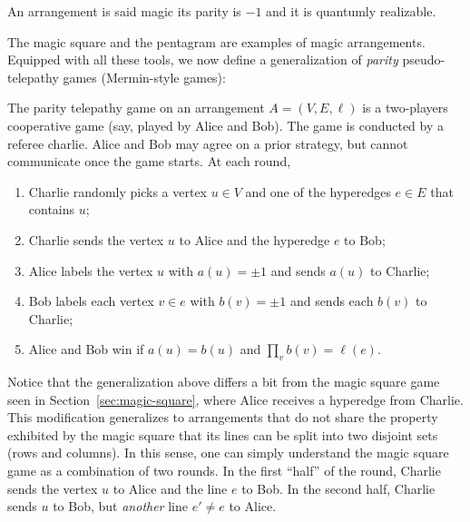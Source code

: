\documentclass{llncs}
\begin{document}
\begin{definition}\label{def:magic-arr}
  An arrangement is said magic its parity is \(-1\) and it is
  quantumly realizable.
\end{definition}

The magic square and the pentagram are examples of magic arrangements.
Equipped with all these tools, we now define a generalization of \emph{parity}
pseudo-telepathy games (Mermin-style games):

\begin{definition}\label{def:parity-game}
  The parity telepathy game on an arrangement \(A = (V, E, \ell)\) is
  a two-players cooperative game (say, played by Alice and Bob). The
  game is conducted by a referee charlie. Alice and Bob may agree on a
  prior strategy, but cannot communicate once the game starts. At each
  round,
  \begin{enumerate}
  \item Charlie randomly picks a vertex \(u \in V\) and one of the hyperedges
    \(e \in E\) that contains \(u\);
    
  \item Charlie sends the vertex \(u\) to Alice and the hyperedge \(e\) to Bob;
    
  \item Alice labels the vertex \(u\) with \(a(u) = \pm{}1\) and sends
    \(a(u)\) to Charlie;

  \item Bob labels each vertex \(v \in e\) with \(b(v) = \pm{}1\) and sends
    each \(b(v)\) to Charlie;
    
  \item Alice and Bob win if \(a(u) = b(u)\) and \(\prod_{v} b(v) = \ell(e)\).
  \end{enumerate}
\end{definition}

Notice that the generalization above differs a bit from the magic
square game seen in Section~\ref{sec:magic-square}, where Alice
receives a hyperedge from Charlie. This modification generalizes to
arrangements that do not share the property exhibited by the magic
square that its lines can be split into two disjoint sets (rows and
columns). In this sense, one can simply understand the magic square
game as a combination of two rounds. In the first ``half'' of the
round, Charlie sends the vertex \(u\) to Alice and the line \(e\) to
Bob. In the second half, Charlie sends \(u\) to Bob, but
\emph{another} line \(e' \neq e\) to Alice.
\end{document}
